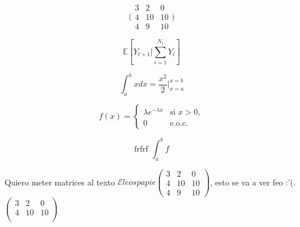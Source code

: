 \documentclass[a4paper, landscape, twocolumn,15pt]{article}
\begin{document}
\[\Bigg(\begin{matrix}
3 & 2 & 0\\
4 & 10 & 10\\
4 & 9 & 10
\end{matrix}\Bigg)
\]

\[\mathbb E \left[Y_{t+1} \Bigg| \sum_{i=1}^{N_t}Y_i\right] \]

\[\int_a^b x dx = \frac{x^2}{2}\bigg|_{x=a}^{x=b}\]

\[f(x) = \begin{cases}
 \lambda e^{-\lambda x} & \text{si }x>0,\\
 0 & \text{e.o.c.}
 \end{cases}
\]

\[\text{frfrf }\int_a^b f\]

Quiero meter matrices al texto $\mathcal{E}leospapie$$\begin{pmatrix}
3 & 2 & 0\\
4 & 10 & 10\\
4 & 9 & 10
\end{pmatrix}$, esto se va a ver feo :'(. $\left(\begin{smallmatrix}
3 & 2 & 0\\
4 & 10 & 10\\
\end{smallmatrix}\right)$
\end{document}

